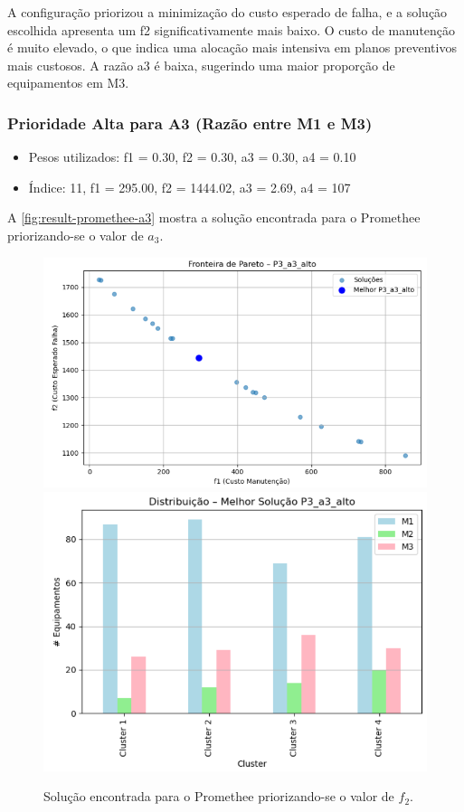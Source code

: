 \documentclass[conference]{IEEEtran}
\begin{document}
A configuração priorizou a minimização do custo esperado de falha, e a solução escolhida apresenta um f2 significativamente mais baixo. O custo de manutenção é muito elevado, o que indica uma alocação mais intensiva em planos preventivos mais custosos. A razão a3 é baixa, sugerindo uma maior proporção de equipamentos em M3.

\subsubsection{Prioridade Alta para A3 (Razão entre M1 e M3)}

\begin{itemize}
	\item Pesos utilizados:  f1 = 0.30, f2 = 0.30, a3 = 0.30, a4 = 0.10
	\item Índice: 11, f1 = 295.00, f2 = 1444.02, a3 = 2.69, a4 = 107
\end{itemize}

A \autoref{fig:result-promethee-a3} mostra a solução encontrada para o Promethee 
priorizando-se o valor de $a_3$.


\begin{figure}[htbp]
    \centering
    \includegraphics[width=\columnwidth,trim=1 1 1 1,clip]{../images/fronteira-promethee-a3.png}
    \includegraphics[width=\columnwidth,trim=1 1 1 1,clip]{../images/result-promethee-a3.png}
    \caption{\label{fig:result-promethee-a3}
	Solução encontrada para o Promethee 
priorizando-se o valor de $f_2$.}
\end{figure}
\end{document}
